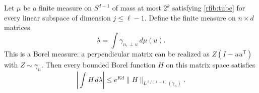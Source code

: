 \begin{lemma}\label{rfib:mixture}
Let \(\mu\) be a finite measure on \(S^{d-1}\) of mass at most \(2^k\)
satisfying \eqref{rfib:tube} for every linear subspace of dimension
\(j\le\ell-1\).  Define the finite measure on \(n\times d\) matrices
\[
 \lambda=\int\gamma_{n,\perp u}\,d\mu(u).
\]
This is a Borel measure: a perpendicular matrix can be realized as
\(Z(I-uu^{\mathsf T})\) with \(Z\sim\gamma_n\).
Then every bounded Borel function \(H\) on this matrix space satisfies
\begin{equation}\label{rfib:mixture-dual}
 \left|\int H\,d\lambda\right|
 \le e^{Kd}\|H\|_{L^{\ell/(\ell-1)}(\gamma_n)} .
\end{equation}
\end{lemma}

